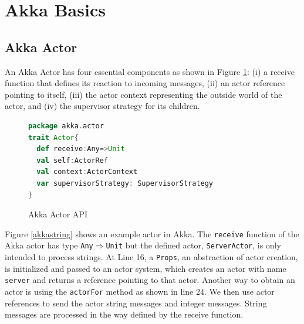 \section{Akka Basics}

\subsection{Akka Actor}
\label{akka actor}


An Akka Actor has four essential components as shown in Figure 
\ref{fig:akka_actor_api}: (i) a receive function that defines its reaction to 
incoming messages, (ii) an actor reference pointing to  itself, (iii) the actor 
 context representing the outside world of the actor, and (iv) the supervisor 
strategy for its children.

\begin{figure}[h]
\label{fig:akka_actor_api}
\begin{lstlisting}[language=scala]
package akka.actor
trait Actor{
  def receive:Any=>Unit
  val self:ActorRef
  val context:ActorContext
  var supervisorStrategy: SupervisorStrategy
}
\end{lstlisting}
\caption{Akka Actor API}
\end{figure}

Figure \ref{akkastring} shows an example actor in Akka.  The {\tt receive} 
function of the Akka actor has type {\tt Any$\Rightarrow$Unit} but the 
defined actor, {\tt ServerActor}, is only intended to process strings.  At Line 
16, a {\tt Props}, an abstraction of actor creation, is initialized and passed 
to an actor system, which creates an actor with name \textcolor{mauve}{\tt 
server} and returns a reference pointing to that actor.  Another way to obtain 
an actor is using the {\tt actorFor} method as shown in line 24.  We then use 
actor references to send the actor string messages and integer messages.  
String messages are processed in the way defined by the receive function.

